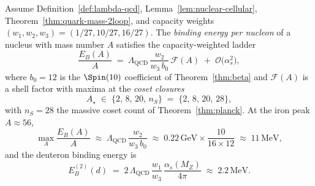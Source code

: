 \begin{theorem}
\label{thm:nuclear-binding}
Assume Definition~\ref{def:lambda-qcd}, Lemma~\ref{lem:nuclear-cellular},
Theorem~\ref{thm:quark-mass-2loop}, and capacity weights
$(w_1,w_2,w_3)=(1/27,10/27,16/27)$. The \emph{binding energy per nucleon}
of a nucleus with mass number $A$ satisfies the capacity-weighted ladder
\begin{equation}\label{eq:binding-ladder}
  \frac{E_B(A)}{A}
  \;=\;
  \Lambda_{\mathrm{QCD}}\,
  \frac{w_2}{w_3\,b_0}\,
  \mathcal{F}(A)
  \;+\;
  \mathcal{O}\!\bigl(\alpha_s^2\bigr),
\end{equation}
where $b_0=12$ is the $\Spin(10)$ coefficient of Theorem~\ref{thm:beta} and
$\mathcal{F}(A)$ is a shell factor with maxima at the \emph{coset closures}
\begin{equation}\label{eq:magic-numbers}
  A_\star \;\in\;\{2,\,8,\,20,\,n_S\}
  \;=\;
  \{2,\,8,\,20,\,28\},
\end{equation}
with $n_S=28$ the massive coset count of Theorem~\ref{thm:planck}. At the
iron peak $A\approx 56$,
\begin{equation}\label{eq:binding-peak}
  \max_A\frac{E_B(A)}{A}
  \;\approx\;
  \Lambda_{\mathrm{QCD}}\,\frac{w_2}{w_3\,b_0}
  \;\approx\;
  0.22\,\mathrm{GeV}\times\frac{10}{16\times 12}
  \;\approx\;
  11\,\mathrm{MeV},
\end{equation}
and the deuteron binding energy is
\begin{equation}\label{eq:deuteron-binding}
  E_B^{(2)}(d)
  \;=\;
  2\,\Lambda_{\mathrm{QCD}}\,
  \frac{w_1}{w_3}\,
  \frac{\alpha_s(M_Z)}{4\pi}
  \;\approx\;
  2.2\,\mathrm{MeV}.
\end{equation}
\end{theorem}

